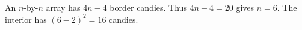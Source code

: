 An $n$-by-$n$ array has $4n-4$ border candies. Thus $4n-4=20$ gives $n=6$. The interior has $(6-2)^2=\boxed{16}$ candies.
